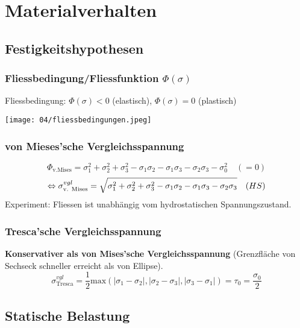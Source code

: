 \vspace{-3mm}
\section{Materialverhalten}{}
    \subsection{Festigkeitshypothesen}
        \subsubsection{Fliessbedingung/Fliessfunktion $\Phi(\sigma)$}
            Fliessbedingung: $\Phi(\sigma)<0$ (elastisch), $\Phi(\sigma)=0$ (plastisch)
            \begin{center}
            \vspace{-2mm}
                \texttt{[image: 04/fliessbedingungen.jpeg]}
            \end{center}
            
        \subsubsection{von Mieses'sche Vergleichsspannung}
            \[\Phi_{\textrm{v.Mises}}= \sigma_1^2+\sigma_2^2+\sigma_3^2-\sigma_1\sigma_2-\sigma_1\sigma_3-\sigma_2\sigma_3 -\sigma_0^2\quad(=0)\]
            \[\Leftrightarrow \sigma_{\textrm{v. Mises}}^{vgl}= \sqrt{\sigma_1^2+\sigma_2^2+\sigma_3^2-\sigma_1\sigma_2-\sigma_1\sigma_3-\sigma_2\sigma_3} \quad\textrm(HS)\]
            Experiment: Fliessen ist unabhängig vom hydrostatischen Spannungszustand.
        \subsubsection{Tresca'sche Vergleichsspannung}
            \textbf{Konservativer als von Mises'sche Vergleichsspannung} (Grenzfläche von Sechseck schneller erreicht als von Ellipse).
            \[\sigma_{\textrm{Tresca}}^{vgl}=\frac{1}{2}\textrm{max} \left(|\sigma_1-\sigma_2|,|\sigma_2-\sigma_3|,|\sigma_3-\sigma_1| \right) =\tau_0=\frac{\sigma_0}{2}\]
    \subsection{Statische Belastung}
        
